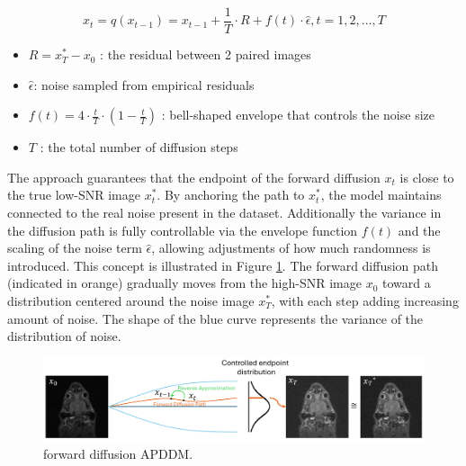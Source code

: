 \documentclass[twocolumn]{article}
\begin{document}
\begin{equation}\label{eq:Markov chain}
x_t=q(x_{t-1})=x_{t-1}+\frac{1}{T}\cdot R+f(t)\cdot \hat{\epsilon}, t=1,2,...,T
\end{equation}
\begin{itemize}
    \item $R=x_T^*-x_0$ : the residual between 2 paired images
    \item $\hat{\epsilon} $: noise sampled from empirical residuals
    \item $f(t)=4 \cdot \frac{t}{T} \cdot (1-\frac{t}{T})$ : bell-shaped envelope that controls the noise size
    \item $T$ : the total number of diffusion steps
\end{itemize}


The approach guarantees that the endpoint of the forward diffusion $x_t$ is close to the true low-SNR image $x_t^*$. By anchoring the path to $x_t^*$, the model maintains connected to the real noise present in the dataset. Additionally the variance in the diffusion path is fully controllable via the envelope function $f(t)$ and the scaling of the noise term $\hat{\epsilon} $, allowing adjustments of how much randomness is introduced. This concept is illustrated in Figure \ref{fig:forward APDDM}. The forward diffusion path (indicated in orange) gradually moves from the high-SNR image $x_0$ toward a distribution centered around the noise image $x_T^*$, with each step adding increasing amount of noise. The shape of the blue curve represents the variance of the distribution of noise.

\begin{figure}[H]
    \centering
    \includegraphics[width=1\linewidth]{forward APDDM.png}
    \caption{forward diffusion APDDM.}
    \label{fig:forward APDDM}
\end{figure}
\end{document}
